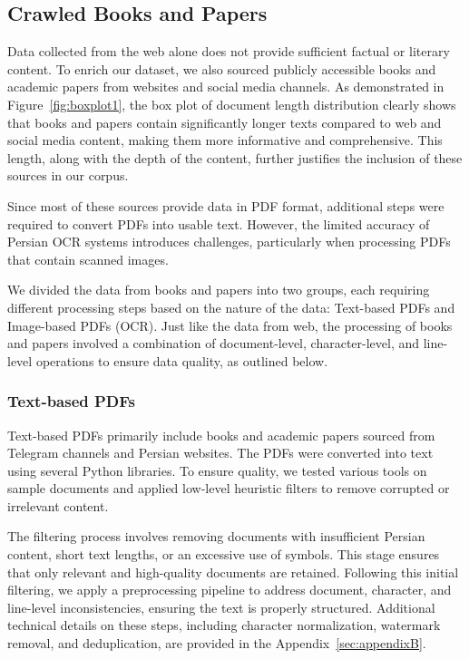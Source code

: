 \subsection{Crawled Books and Papers}
Data collected from the web alone does not provide sufficient factual or literary content. To enrich our dataset, we also sourced publicly accessible books and academic papers from websites and social media channels. As demonstrated in Figure~\ref{fig:boxplot1}, the box plot of document length distribution clearly shows that books and papers contain significantly longer texts compared to web and social media content, making them more informative and comprehensive. This length, along with the depth of the content, further justifies the inclusion of these sources in our corpus. 

Since most of these sources provide data in PDF format, additional steps were required to convert PDFs into usable text. However, the limited accuracy of Persian OCR systems introduces challenges, particularly when processing PDFs that contain scanned images.

We divided the data from books and papers into two groups, each requiring different processing steps based on the nature of the data: Text-based PDFs and Image-based PDFs (OCR). Just like the data from web, the processing of books and papers involved a combination of document-level, character-level, and line-level operations to ensure data quality, as outlined below.

\subsubsection{Text-based PDFs}
Text-based PDFs primarily include books and academic papers sourced from Telegram channels and Persian websites. The PDFs were converted into text using several Python libraries. To ensure quality, we tested various tools on sample documents and applied low-level heuristic filters to remove corrupted or irrelevant content.

The filtering process involves removing documents with insufficient Persian content, short text lengths, or an excessive use of symbols. This stage ensures that only relevant and high-quality documents are retained. Following this initial filtering, we apply a preprocessing pipeline to address document, character, and line-level inconsistencies, ensuring the text is properly structured. Additional technical details on these steps, including character normalization, watermark removal, and deduplication, are provided in the Appendix~\ref{sec:appendixB}.

